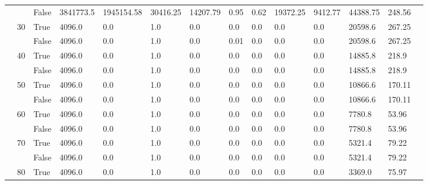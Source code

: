\documentclass{article}
\begin{document}
\begin{landscape}
\begin{small}
\begin{longtable}[c]{@{}lll|ll|ll|ll|ll|lll@{}}
   &    & False & 3841773.5       & 1945154.58     & 30416.25      & 14207.79      & 0.95          & 0.62          & 19372.25      & 9412.77       & 44388.75      & 248.56      &  \\
   & 30 & True  & 4096.0          & 0.0            & 1.0           & 0.0           & 0.0           & 0.0           & 0.0           & 0.0           & 20598.6       & 267.25      &  \\
   &    & False & 4096.0          & 0.0            & 1.0           & 0.0           & 0.01          & 0.0           & 0.0           & 0.0           & 20598.6       & 267.25      &  \\
   & 40 & True  & 4096.0          & 0.0            & 1.0           & 0.0           & 0.0           & 0.0           & 0.0           & 0.0           & 14885.8       & 218.9       &  \\
   &    & False & 4096.0          & 0.0            & 1.0           & 0.0           & 0.0           & 0.0           & 0.0           & 0.0           & 14885.8       & 218.9       &  \\
   & 50 & True  & 4096.0          & 0.0            & 1.0           & 0.0           & 0.0           & 0.0           & 0.0           & 0.0           & 10866.6       & 170.11      &  \\
   &    & False & 4096.0          & 0.0            & 1.0           & 0.0           & 0.0           & 0.0           & 0.0           & 0.0           & 10866.6       & 170.11      &  \\
   & 60 & True  & 4096.0          & 0.0            & 1.0           & 0.0           & 0.0           & 0.0           & 0.0           & 0.0           & 7780.8        & 53.96       &  \\
   &    & False & 4096.0          & 0.0            & 1.0           & 0.0           & 0.0           & 0.0           & 0.0           & 0.0           & 7780.8        & 53.96       &  \\
   & 70 & True  & 4096.0          & 0.0            & 1.0           & 0.0           & 0.0           & 0.0           & 0.0           & 0.0           & 5321.4        & 79.22       &  \\
   &    & False & 4096.0          & 0.0            & 1.0           & 0.0           & 0.0           & 0.0           & 0.0           & 0.0           & 5321.4        & 79.22       &  \\
   & 80 & True  & 4096.0          & 0.0            & 1.0           & 0.0           & 0.0           & 0.0           & 0.0           & 0.0           & 3369.0        & 75.97       &  \\

\end{longtable}
\end{small}
\end{landscape}
\end{document}
